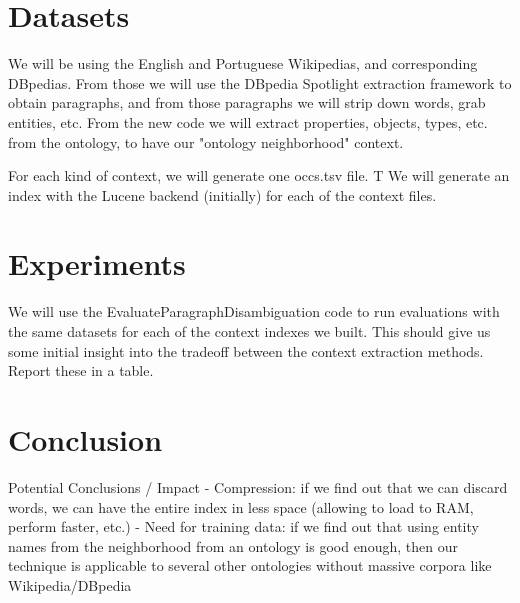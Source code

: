 \documentclass[10pt,a4paper]{article}
\begin{document}
\section{Datasets}

We will be using the English and Portuguese Wikipedias, and corresponding DBpedias. From those we will use the DBpedia Spotlight extraction framework to obtain paragraphs, and from those paragraphs we will strip down words, grab entities, etc. From the new code we will extract properties, objects, types, etc. from the ontology, to have our "ontology neighborhood" context. 

For each kind of context, we will generate one occs.tsv file. T
We will generate an index with the Lucene backend (initially) for each of the context files. 

\section{Experiments}

We will use the EvaluateParagraphDisambiguation code to run evaluations with the same datasets for each of the context indexes we built. This should give us some initial insight into the tradeoff between the context extraction methods. Report these in a table.


\section{Conclusion}

Potential Conclusions / Impact
- Compression: if we find out that we can discard words, we can have the entire index in less space (allowing to load to RAM, perform faster, etc.)
- Need for training data: if we find out that using entity names from the neighborhood from an ontology is good enough, then our technique is applicable to several other ontologies without massive corpora like Wikipedia/DBpedia
\end{document}
